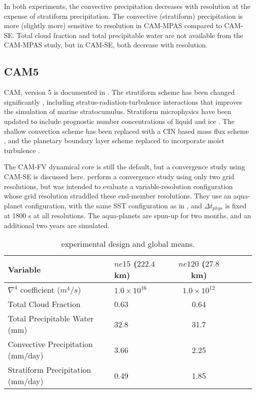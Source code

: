 In both experiments, the convective precipitation decreases with resolution at the expense of stratiform precipitation. The convective (stratiform) precipitation is more (slightly more) sensitive to resolution in CAM-MPAS compared to CAM-SE. Total cloud fraction and total precipitable water are not available from the CAM-MPAS study, but in CAM-SE, both decrease with resolution.

\subsection{CAM5}

CAM, version 5 is documented in \citep{CAM5}. The stratiform scheme has been changed significantly \citep{PETAL2014JCLIM}, including stratus-radiation-turbulence interactions that improves the simulation of marine stratocumulus. Stratiform microphysics have been updated to include prognostic number concentrations of liquid and ice \citep{MG2008JC}. The shallow convection scheme has been replaced with a CIN based mass flux scheme \citep{PB2009JC}, and the planetary boundary layer scheme replaced to incorporate moist turbulence \citep{BC2009JCLIM}.

The CAM-FV dynamical core is still the default, but a convergence study using CAM-SE is discussed here. \cite{ZetAl2014JCb} perform a convergence study using only two grid resolutions, but was intended to evaluate a variable-resolution configuration whose grid resolution straddled these end-member resolutions. They use an aqua-planet configuration, with the same SST configuration as in \cite{W2008TELLUS} \citep[`CONTROL' in][]{NH2000ASL}, and $\Delta t_{phys}$ is fixed at 1800 s at all resolutions. The aqua-planets are spun-up for two months, and an additional two years are simulated.

 \begin{table}
 \caption{\cite{ZetAl2014JCb} experimental design and global means.}
 \centering
 \scriptsize
 \begin{tabular}{llcccc}
 \hline
Variable & $ne15$ ($222.4$ km) & $ne120$ ($27.8$ km)\\
 \hline
   $\nabla^{4}$ coefficient ($m^4/s$) & $1.0 \times 10^{16}$ & $1.0 \times 10^{12}$ \\
   Total Cloud Fraction & 0.63 & 0.64 \\
   Total Precipitable Water (mm) & 32.8 & 31.7 \\
   Convective Precipitation (mm/day) & 3.66 & 2.25 \\
   Stratiform Precipitation (mm/day) & 0.49 & 1.85 \\
 \hline
 \end{tabular}
 \label{tbl:table1-5}
 \end{table}

